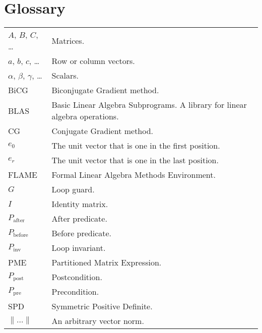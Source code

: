 \section*{Glossary}


\begin{table}[htp]
\begin{center}
\begin{tabular}{l p{9cm}}
$A$, $B$, $C$, …		&	Matrices. \\
$a$, $b$, $c$, …		&	Row or column vectors. \\
$\alpha$, $\beta$, $\gamma$, …	&	Scalars. \\
BiCG				&	Biconjugate Gradient method.\\
BLAS				& 	Basic Linear Algebra Subprograms. A library for linear algebra operations.\\
CG					& 	Conjugate Gradient method.\\
$e_0$				& 	The unit vector that is one in the first position.\\
$e_r$				& 	The unit vector that is one in the last position.\\
FLAME				& 	Formal Linear Algebra Methods Environment.\\
$G$					&	Loop guard. \\
$I$					&	Identity matrix. \\
$P_\text{after}$			&	After predicate. \\
$P_\text{before}$		&	Before predicate. \\
$P_\text{inv}$			&	Loop invariant. \\
PME					&	Partitioned Matrix Expression. \\
$P_\text{post}$			&	Postcondition. \\
$P_\text{pre}$			&	Precondition. \\
SPD					&	Symmetric Positive Definite. \\
$\| \ldots \|$			&	An arbitrary vector norm.
\end{tabular}

\end{center}
\end{table}